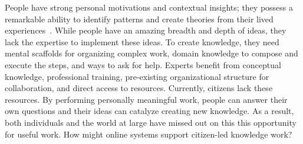 

People have strong personal motivations and contextual insights; they possess a remarkable ability to identify patterns and create theories from their lived experiences~\cite{Gelman2011}. While people have an amazing breadth and depth of ideas, they lack the expertise to implement these ideas. To create knowledge, they need mental scaffolds for organizing complex work, domain knowledge to compose and execute the steps, and ways to ask for help. Experts benefit from conceptual knowledge, professional training, pre-existing organizational structure for collaboration, and direct access to resources. Currently, citizens lack these resources. By performing personally meaningful work, people can answer their own questions and their ideas can catalyze creating new knowledge. As a result, both individuals and the world at large have missed out on this this opportunity for useful work. How might online systems support citizen-led knowledge work? 





